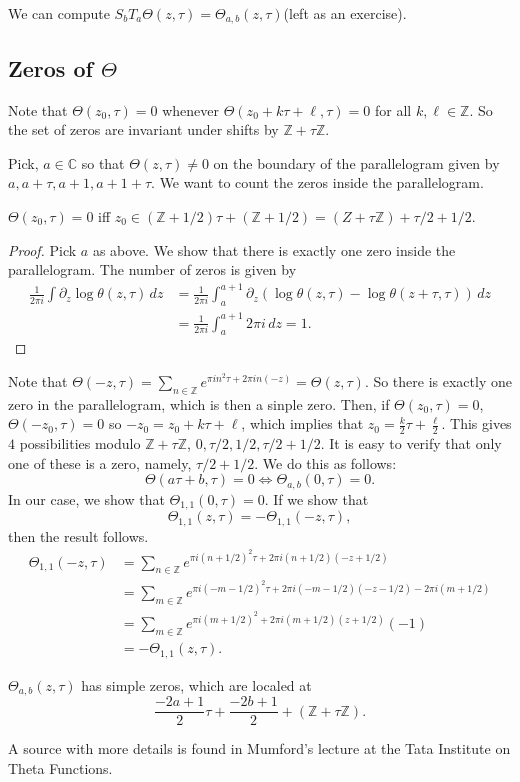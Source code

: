 \documentclass[12pt]{scrartcl}
\newcommand{\Z}{\mathbb{Z}}
\newcommand{\C}{\mathbb C}
\begin{document}
We can compute $S_bT_a \Theta(z, \tau) = \Theta_{a, b}(z, \tau)$(left as an exercise).
\subsection{Zeros of $\Theta$}
Note that $\Theta(z_0, \tau) = 0$ whenever $\Theta(z_0 + k\tau + \ell, \tau) = 0$ for all $k, \ell \in \Z$.  So the set of zeros are invariant under shifts by $\Z + \tau \Z$.

Pick, $a\in\C$ so that $\Theta(z, \tau) \ne 0$ on the boundary of the parallelogram given by $a, a+\tau, a + 1, a + 1 + \tau$.  We want to count the zeros inside the parallelogram.  

\begin{lemma} $\Theta(z_0, \tau) = 0$ iff $z_0 \in (\Z + 1/2) \tau+ (\Z+ 1/2) = (Z + \tau\Z) + \tau/2 + 1/2$.  
\end{lemma}
\begin{proof}
Pick $a$ as above.  We show that there is exactly one zero inside the parallelogram.  
The number of zeros is given by 
\begin{align*}
\frac{1}{2\pi i} \int \partial_z \log \theta(z, \tau)\,dz &= \frac{1}{2\pi i} \int_a^{a+1} \partial_z (\log \theta(z, \tau) - \log \theta(z + \tau, \tau)) \,dz \\
&= \frac{1}{2\pi i} \int_{a}^{a+1} 2\pi i \,dz = 1.
\end{align*}

\end{proof}

Note that $\Theta(-z, \tau) = \sum_{n \in \Z} e^{\pi i n^2 \tau + 2\pi i n (-z)} = \Theta(z, \tau)$.  So there is exactly one zero in the parallelogram, which is then a sinple zero.  Then, if $\Theta(z_0, \tau ) = 0$, $\Theta(-z_0, \tau) = 0$ so $-z_0 = z_0 + k\tau + \ell$, which implies that $z_0 = \frac{k}{2}\tau + \frac{\ell}{2}$.  This gives $4$ possibilities modulo $\Z + \tau \Z$, $0, \tau/2, 1/2, \tau/2+1/2$.  It is easy to verify that only one of these is a zero, namely, $\tau/2 + 1/2$.
We do this as follows:
$$\Theta(a\tau + b, \tau) = 0 \Leftrightarrow \Theta_{a, b}(0, \tau) = 0.$$
In our case, we show that $\Theta_{1, 1}(0, \tau) = 0$.  If we show that 
$$\Theta_{1, 1}(z, \tau) = -\Theta_{1, 1}(-z, \tau),$$
then the result follows.  
\begin{align*}
\Theta_{1, 1}(-z, \tau) &= \sum_{n \in \Z} e^{\pi i(n + 1/2)^2 \tau + 2 \pi i (n + 1/2)(-z + 1/2)} \\
&= \sum_{m \in \Z} e^{\pi i (-m - 1/2)^2 \tau + 2\pi i (-m -1/2)(-z - 1/2) - 2\pi i(m + 1/2)} \\
&= \sum_{m \in \Z} e^{\pi i(m + 1/2)^2 + 2 \pi i (m + 1/2)(z + 1/2)}(-1) \\
&= - \Theta_{1, 1}(z, \tau).
\end{align*}
\begin{corollary} $\Theta_{a, b}(z, \tau)$ has simple zeros, which are localed at 
$$\frac{-2a + 1}{2} \tau + \frac{-2b+1}{2} + (\Z + \tau \Z).$$
\end{corollary}
A source with more details is found in Mumford's lecture at the Tata Institute on Theta Functions.  
\pagebreak
\end{document}
